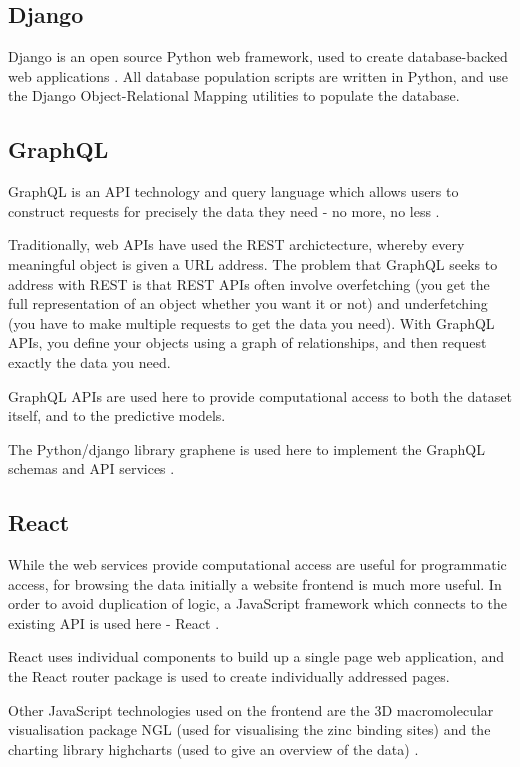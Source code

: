 \subsection{Django}

Django is an open source Python web framework, used to create database-backed web applications \cite{django}. All database population scripts are written in Python, and use the Django Object-Relational Mapping utilities to populate the database.

\subsection{GraphQL}

GraphQL is an API technology and query language which allows users to construct requests for precisely the data they need - no more, no less \cite{graphql}.

Traditionally, web APIs have used the REST archictecture, whereby every meaningful object is given a URL address. The problem that GraphQL seeks to address with REST is that REST APIs often involve overfetching (you get the full representation of an object whether you want it or not) and underfetching (you have to make multiple requests to get the data you need). With GraphQL APIs, you define your objects using a graph of relationships, and then request exactly the data you need.

GraphQL APIs are used here to provide computational access to both the dataset itself, and to the predictive models.

The Python/django library graphene is used here to implement the GraphQL schemas and API services \cite{graphene}.

\subsection{React}

While the web services provide computational access are useful for programmatic access, for browsing the data initially a website frontend is much more useful. In order to avoid duplication of logic, a JavaScript framework which connects to the existing API is used here - React \cite{react}.

React uses individual components to build up a single page web application, and the React router package is used to create individually addressed pages.

Other JavaScript technologies used on the frontend are the 3D macromolecular visualisation package NGL (used for visualising the zinc binding sites) \cite{rose2015ngl} and the charting library highcharts (used to give an overview of the data) \cite{highcharts}.